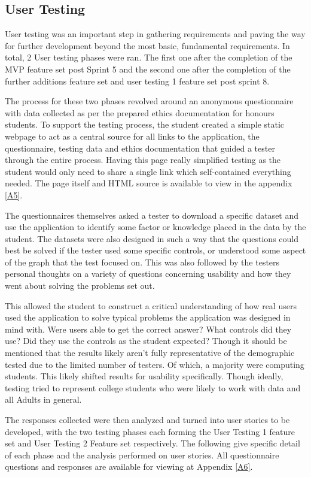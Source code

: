 \subsection{User Testing} \label{usertest1}
User testing was an important step in gathering requirements and paving the way for further development beyond the most basic, fundamental requirements. In total, 2 User testing phases were ran. The first one after the completion of the MVP feature set post Sprint 5 and the second one after the completion of the further additions feature set and user testing 1 feature set post sprint 8.

The process for these two phases revolved around an anonymous questionnaire with data collected as per the prepared ethics documentation for honours students.
To support the testing process, the student created a simple static webpage to act as a central source for all links to the application, the questionnaire, testing data and ethics documentation that guided a tester through the entire process. Having this page really simplified testing as the student would only need to share a single link which self-contained everything needed. The page itself and HTML source is available to view in the appendix \ref{A5}.

The questionnaires themselves asked a tester to download a specific dataset and use the application to identify some factor or knowledge placed in the data by the student. The datasets were also designed in such a way that the questions could best be solved if the tester used some specific controls, or understood some aspect of the graph that the test focused on. This was also followed by the testers personal thoughts on a variety of questions concerning usability and how they went about solving the problems set out.

This allowed the student to construct a critical understanding of how real users used the application to solve typical problems the application was designed in mind with. Were users able to get the correct answer? What controls did they use? Did they use the controls as the student expected? Though it should be mentioned that the results likely aren't fully representative of the demographic tested due to the limited number of testers. Of which, a majority were computing students. This likely shifted results for usability specifically. Though ideally, testing tried to represent college students who were likely to work with data and all Adults in general.

The responses collected were then analyzed and turned into user stories to be developed, with the two testing phases each forming the User Testing 1 feature set and User Testing 2 Feature set respectively. The following give specific detail of each phase and the analysis performed on user stories. All questionnaire questions and responses are available for viewing at Appendix \ref{A6}.

